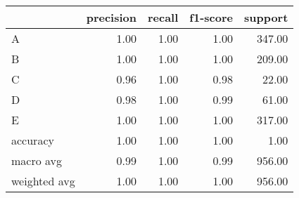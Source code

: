 \begin{tabular}{|l|r|r|r|r|}
\hline
{} &  precision &  recall &  f1-score &  support \\
\hline
A            &       1.00 &    1.00 &      1.00 &   347.00 \\
B            &       1.00 &    1.00 &      1.00 &   209.00 \\
C            &       0.96 &    1.00 &      0.98 &    22.00 \\
D            &       0.98 &    1.00 &      0.99 &    61.00 \\
E            &       1.00 &    1.00 &      1.00 &   317.00 \\
accuracy     &       1.00 &    1.00 &      1.00 &     1.00 \\
macro avg    &       0.99 &    1.00 &      0.99 &   956.00 \\
weighted avg &       1.00 &    1.00 &      1.00 &   956.00 \\
\hline
\end{tabular}
